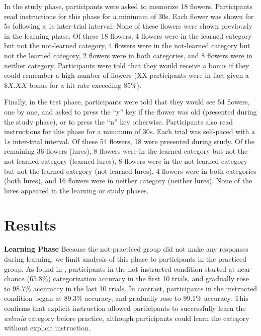 \documentclass[twocolumn]{svjour3}          %
\begin{document}
In the study phase, participants were asked to memorize 18
flowers. Participants read instructions for this phase for a minimum
of 30s.  Each flower was shown for 5s following a 1s inter-trial
interval. None of these flowers were shown previously in the learning
phase. Of these 18 flowers, 4 flowers were in the learned category but
not the not-learned category, 4 flowers were in the not-learned
category but not the learned category, 2 flowers were in both
categories, and 8 flowers were in neither category. Participants were
told that they would receive a bonus if they could remember a high
number of flowers (XX participants were in fact given a $\$X.XX$ bonus
for a hit rate exceeding 85\%).

Finally, in the test phase, participants were told that they would see
54 flowers, one by one, and asked to press the ``y'' key if the flower
was old (presented during the study phase), or to press the ``n'' key
otherwise. Participants also read instructions for this phase for a
minimum of 30s. Each trial was self-paced with a 1s inter-trial
interval. Of these 54 flowers, 18 were presented during study. Of the
remaining 36 flowers (lures), 8 flowers were in the learned category
but not the not-learned category (learned lures), 8 flowers were in
the not-learned category but not the learned category (not-learned
lures), 4 flowers were in both categories (both lures), and 16 flowers
were in neither category (neither lures). None of the lures appeared
in the learning or study phases.

\section*{Results}
\label{results}

\noindent\textbf{Learning Phase }
Because the not-practiced group did not make any responses during
learning, we limit analysis of this phase to participants in the
practiced group. As found in \citet{DeBrigard2017}, participants in
the not-instructed condition started at near chance (65.8\%)
categorization accuracy in the first 10 trials, and gradually rose to
98.7\% accuraccy in the last 10 trials. In contrast, participants in
the instructed condition began at 89.3\% accuracy, and gradually rose
to 99.1\% accuracy. This confirms that explicit instruction allowed
participants to successfully learn the \emph{avlonia} category before
practice, although participants could learn the category without
explicit instruction.
\end{document}
